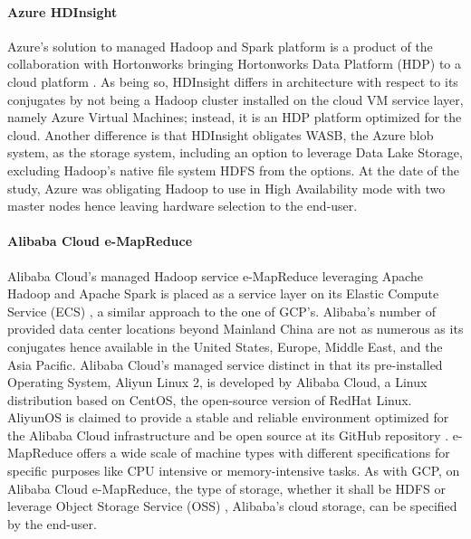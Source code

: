 \documentclass[review]{elsarticle}
\begin{document}
\paragraph{Azure HDInsight \cite{noauthor_azure_nodate}}Azure's solution to managed Hadoop and Spark platform is a product of the collaboration with Hortonworks bringing Hortonworks Data Platform (HDP) to a cloud platform \cite{noauthor_azuravail_nodate}. As being so, HDInsight differs in architecture with respect to its conjugates by not being a Hadoop cluster installed on the cloud VM service layer, namely Azure Virtual Machines; instead, it is an HDP platform optimized for the cloud. Another difference is that HDInsight obligates WASB, the Azure blob system, as the storage system, including an option to leverage Data Lake Storage, excluding Hadoop's native file system HDFS from the options. At the date of the study, Azure was obligating Hadoop to use in High Availability mode with two master nodes hence leaving hardware selection to the end-user.

\paragraph{Alibaba Cloud e-MapReduce \cite{noauthor_what_nodate}}Alibaba Cloud's managed Hadoop service e-MapReduce leveraging Apache Hadoop and Apache Spark is placed as a service layer on its Elastic Compute Service (ECS) \cite{noauthor_alielastic_nodate}, a similar approach to the one of GCP's. Alibaba's number of provided data center locations beyond Mainland China are not as numerous as its conjugates hence available in the United States, Europe, Middle East, and the Asia Pacific. Alibaba Cloud's managed service distinct in that its pre-installed Operating System, Aliyun Linux 2, is developed by Alibaba Cloud, a Linux distribution based on CentOS, the open-source version of RedHat Linux. AliyunOS is claimed to provide a stable and reliable environment optimized for the Alibaba Cloud infrastructure and be open source at its GitHub repository \cite{noauthor_alibaba_nodate}. e-MapReduce offers a wide scale of machine types with different specifications for specific purposes like CPU intensive or memory-intensive tasks. As with GCP, on Alibaba Cloud e-MapReduce, the type of storage, whether it shall be HDFS or leverage Object Storage Service (OSS) \cite{noauthor_oss_nodate}, Alibaba's cloud storage, can be specified by the end-user.
\end{document}
